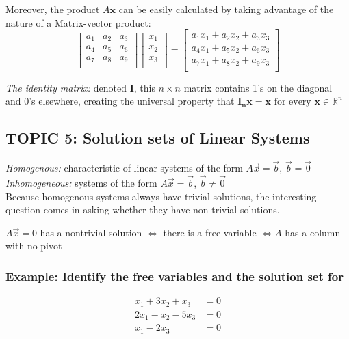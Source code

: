 \documentclass[12pt]{article} %
\newcommand{\R}{\mathbb{R}}
\newcommand{\mateq}{$A \vec{x} = \vec{b}$}
\begin{document}
Moreover, the product $A\mathbf{x}$ can be easily calculated by taking advantage of the nature of a Matrix-vector product:
$$\begin{bmatrix}
	a_1 & a_2 & a_3\\
	a_4 & a_5 & a_6\\
	a_7 & a_8 & a_9\\
\end{bmatrix}\begin{bmatrix}
	x_1\\
	x_2\\
	x_3\\
\end{bmatrix} = \begin{bmatrix}
	a_1 x_1 + a_2 x_2 + a_3 x_3\\
	a_4 x_1 + a_5 x_2 + a_6 x_3\\
	a_7 x_1 + a_8 x_2 + a_9 x_3\\
\end{bmatrix}$$

\emph{The identity matrix:} denoted $\mathbf{I}$, this $n\times n$ matrix contains 1's on the diagonal and 0's elsewhere, creating the universal property that $\mathbf{I_n x} = \mathbf{x} \text{  for every  } \mathbf{x} \in \R^n$

\subsection{TOPIC 5: Solution sets of Linear Systems}
\emph{Homogenous:} characteristic of linear systems of the form \mateq, $\vec{b} = \vec{0}$\\

\emph{Inhomogeneous:} systems of the form \mateq, $\vec{b} \neq \vec{0}$\\

Because homogenous systems always have trivial solutions, the interesting question comes in asking whether they have non-trivial solutions.


\begin{center}
	$A \vec{x} = 0$ has a nontrivial solution $\iff$ there is a free variable $\iff A$ has a column with no pivot
\end{center}


\subsubsection{Example: Identify the free variables and the solution set for}
\begin{align*}
	x_1 + 3x_2 + x_3 &= 0\\
	2x_1 - x_2 - 5x_3 &= 0\\
	x_1 - 2x_3 &= 0
\end{align*}
\end{document}
